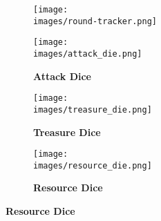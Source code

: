 \begin{figure}[H]
  \centering
  \begin{subfigure}[c]{0.4\linewidth}
    \centering
    \texttt{[image: \\images/round-tracker.png]}
    \caption{\textbf{}}
  \end{subfigure}
  \begin{subfigure}[c]{0.15\linewidth}
    \centering
    \texttt{[image: \\images/attack\_die.png]}
    \caption{\textbf{Attack Dice} \\\phantom{Population}}
  \end{subfigure}
  \begin{subfigure}[c]{0.15\linewidth}
    \centering
    \texttt{[image: \\images/treasure\_die.png]}
    \caption{\textbf{Treasure Dice}}
  \end{subfigure}
  \begin{subfigure}[c]{0.15\linewidth}
    \centering
    \texttt{[image: \\images/resource\_die.png]}
    \caption{\textbf{Resource Dice}}
  \end{subfigure}
\end{figure}




